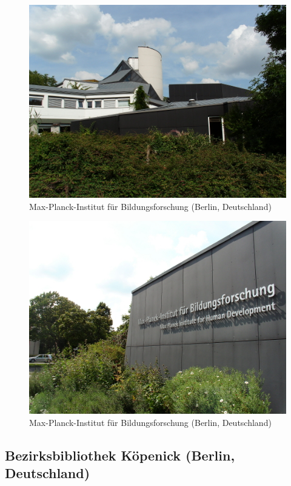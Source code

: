\documentclass[a4paper,
fontsize=11pt,
oneside,
numbers=noperiodatend,
parskip=half-,
bibliography=totoc,
final
]{scrartcl}
\begin{document}
\begin{figure}[htbp]
\centering
\includegraphics{./img/054.jpg}
\caption{Max-Planck-Institut für Bildungsforschung (Berlin,
Deutschland)}
\end{figure}

\begin{figure}[htbp]
\centering
\includegraphics{./img/055.jpg}
\caption{Max-Planck-Institut für Bildungsforschung (Berlin,
Deutschland)}
\end{figure}

\subsection*{Bezirksbibliothek Köpenick (Berlin,
Deutschland)}\label{bezirksbibliothek-kuxf6penick-berlin-deutschland}
\end{document}
